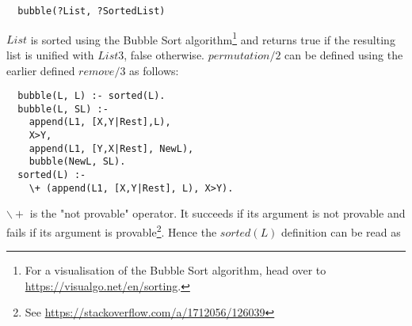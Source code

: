 \documentclass{article}
\begin{document}
\begin{multicols}{2}
  \begin{lstlisting}
  bubble(?List, ?SortedList)
  \end{lstlisting}
  
  $List$ is sorted using the Bubble Sort algorithm\footnote{For a visualisation of the Bubble Sort algorithm, head over to \href{https://visualgo.net/en/sorting}{https://visualgo.net/en/sorting}.} and returns true if the resulting list is unified with $List3$, false otherwise. $permutation/2$ can be defined using the earlier defined $remove/3$ as follows:

  \begin{lstlisting}
  bubble(L, L) :- sorted(L).
  bubble(L, SL) :-
    append(L1, [X,Y|Rest],L),
    X>Y,
    append(L1, [Y,X|Rest], NewL),
    bubble(NewL, SL).
  sorted(L) :-
    \+ (append(L1, [X,Y|Rest], L), X>Y).
  \end{lstlisting}  

  $\backslash+$ is the "not provable" operator. It succeeds if its argument is not provable and fails if its argument is provable\footnote{See \href{https://stackoverflow.com/a/1712056/126039}{https://stackoverflow.com/a/1712056/126039}}. Hence the $sorted(L)$ definition can be read as 
 
  \end{multicols}
\end{document}
